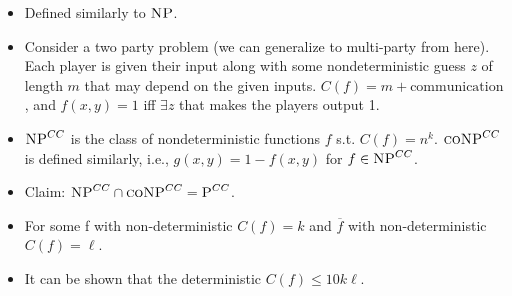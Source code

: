 \begin{itemize}
	\item Defined similarly to $\textsc{NP}$.
	\pause
	\item Consider a two party problem (we can generalize to multi-party from here).  Each player is given their input along with some nondeterministic guess $z$ of length $m$ that may depend on the given inputs.  $C(f) = m + \text{communication}$, and $f(x, y) = 1$ iff $\exists z$ that makes the players output 1.
	\pause
	\item $\textsc{NP}^{CC}$ is the class of nondeterministic functions $f$ s.t. $C(f) = n^{k}$.  $\textsc{coNP}^{CC}$ is defined similarly, i.e., $g(x, y) = 1 - f(x, y)$ for $f \in \textsc{NP}^{CC}$.
	\pause
	\item Claim: $\textsc{NP}^{CC} \cap \textsc{coNP}^{CC} = \textsc{P}^{CC}$.
	\pause
	\item For some f with non-deterministic $C(f) = k$ and  $\overline{f}$ with non-deterministic $C(f) = \ell$.
	\item It can be shown that the deterministic $C(f) \leq 10k\ell$.
\end{itemize}
